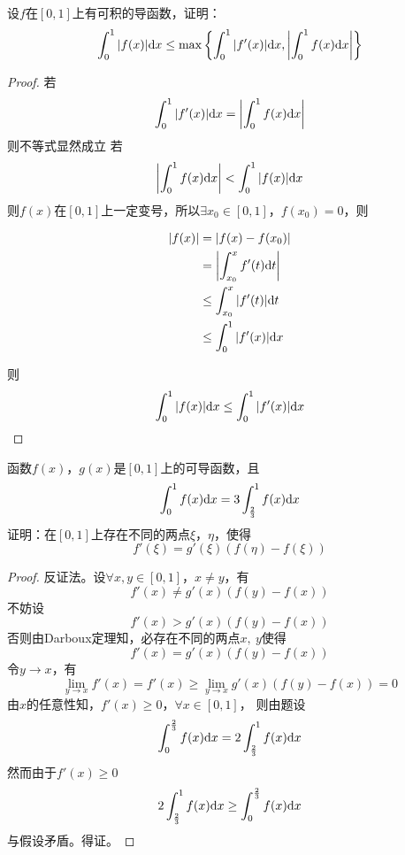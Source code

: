 \begin{proposition}

    设$f$在$[0,1]$上有可积的导函数，证明：
    $$\int_{0}^{1}{|f(x)|}\mathrm{d} x \leq \max\left\{\int_{0}^{1}{|f'(x)|}\mathrm{d} x, \left|\int_{0}^{1}{f(x)}\mathrm{d} x\right|\right\}$$

\end{proposition}

\begin{proof}
    
    若
    $$\int_{0}^{1}{|f'(x)|}\mathrm{d} x = \left|\int_{0}^{1}{f(x)}\mathrm{d} x\right|$$
    则不等式显然成立
    若
    $$\left|\int_{0}^{1}{f(x)}\mathrm{d} x\right| < \int_{0}^{1}{|f(x)|}\mathrm{d} x$$
    则$f(x)$在$[0,1]$上一定变号，所以$\exists x_0 \in [0,1]$，$f(x_0) = 0$，则

    \begin{align*}
        |f(x)| & = |f(x) - f(x_0)| \\
        & = \left|\int_{x_0}^{x}{f'(t)}\mathrm{d} t\right| \\
        & \leq \int_{x_0}^{x}{|f'(t)|}\mathrm{d} t \\
        & \leq \int_{0}^{1}{|f'(x)|}\mathrm{d} x
    \end{align*}

    则
    $$\int_{0}^{1}{|f(x)|}\mathrm{d} x \leq \int_{0}^{1}{|f'(x)|}\mathrm{d} x$$

\end{proof}

\begin{proposition}
    
    函数$f(x)$，$g(x)$是$[0,1]$上的可导函数，且
    $$\int_{0}^{1}{f(x)}\mathrm{d} x = 3 \int_{\frac{2}{3}}^{1}{f(x)}\mathrm{d} x$$
    证明：在$[0,1]$上存在不同的两点$\xi$，$\eta$，使得
    $$f'(\xi) = g'(\xi)(f(\eta) - f(\xi))$$

\end{proposition}

\begin{proof}

    反证法。设$\forall x,y \in [0,1]$，$x \neq y$，有
    $$f'(x) \neq g'(x)(f(y) - f(x))$$
    不妨设
    $$f'(x) > g'(x)(f(y) - f(x))$$
    否则由\textup{Darboux}定理知，必存在不同的两点$x,\ y$使得
    $$f'(x) = g'(x)(f(y) - f(x))$$
    令$y \to x$，有
    $$\lim_{y \to x}{f'(x)} = f'(x) \geq \lim_{y \to x}{g'(x)(f(y) - f(x))} = 0$$
    由$x$的任意性知，$f'(x) \geq 0$，$\forall x \in [0,1]$，
    则由题设
    $$\int_{0}^{\frac{2}{3}}{f(x)}\mathrm{d} x = 2 \int_{\frac{2}{3}}^{1}{f(x)}\mathrm{d} x$$
    然而由于$f'(x) \geq 0$
    $$2 \int_{\frac{2}{3}}^{1}{f(x)}\mathrm{d} x \geq \int_{0}^{\frac{2}{3}}{f(x)}\mathrm{d} x $$
    与假设矛盾。得证。

\end{proof}

